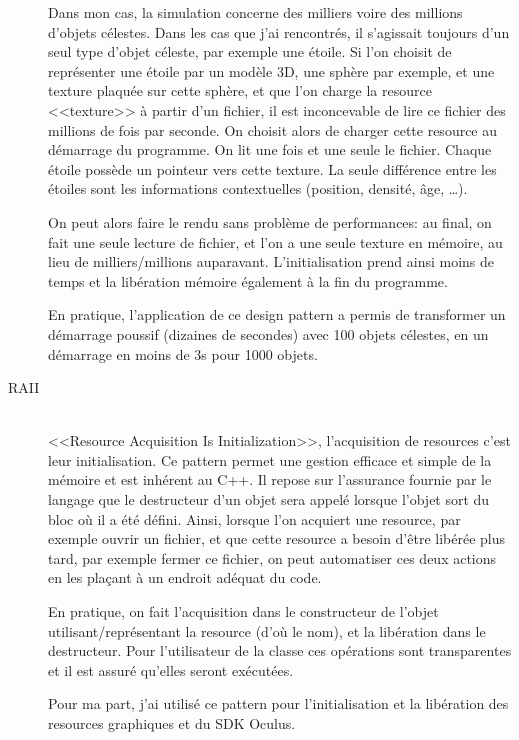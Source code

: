 \documentclass[a4paper,french,12pt]{article}
\begin{document}
\begin{description}
	       Dans mon cas, la simulation concerne des milliers voire des millions d'objets célestes. Dans les cas que j'ai
	       rencontrés, il s'agissait toujours d'un seul type d'objet céleste, par exemple une étoile.
	       Si l'on choisit de représenter une étoile par un modèle 3D, une sphère par exemple, et une
	       texture plaquée sur cette sphère, et que l'on charge la resource <<texture>> à partir d'un fichier, il est inconcevable
	       de lire ce fichier des millions de fois par seconde.
	       On choisit alors de charger cette resource au démarrage du programme. On lit une fois et une seule le fichier.
	       Chaque étoile possède un pointeur vers cette texture. 
	       La seule différence entre les étoiles sont les informations contextuelles (position, densité, âge, \ldots).
	       
	       On peut alors faire le rendu sans problème de performances: au final, on fait une seule lecture de fichier, et
	       l'on a une seule texture en mémoire, au lieu de milliers/millions auparavant.
	       L'initialisation prend ainsi moins de temps et la libération mémoire également à la fin du programme.
	       
	       En pratique, l'application de ce design pattern a permis de transformer un démarrage poussif (dizaines de secondes) avec 100 objets célestes,
	       en un démarrage en moins de 3s pour 1000 objets.
	    
	    \item [RAII]~\\
	      <<Resource Acquisition Is Initialization>>, l'acquisition de resources c'est leur initialisation.
	      Ce pattern permet une gestion efficace et simple de la mémoire et est inhérent au C++.
	      Il repose sur l'assurance fournie par le langage que le destructeur d'un objet sera appelé lorsque l'objet
	      sort du bloc où il a été défini.
	      Ainsi, lorsque l'on acquiert une resource, par exemple ouvrir un fichier, et que cette resource a besoin
	      d'être libérée plus tard, par exemple fermer ce fichier, on peut automatiser ces deux actions en les plaçant
	      à un endroit adéquat du code.
	      
	      En pratique, on fait l'acquisition dans le constructeur de l'objet utilisant/représentant la resource (d'où le nom), et 
	      la libération dans le destructeur. Pour l'utilisateur de la classe ces opérations sont transparentes et il est
	      assuré qu'elles seront exécutées.
	      
	      
	      Pour ma part, j'ai utilisé ce pattern pour l'initialisation et la libération des resources graphiques et
	      du SDK Oculus.
	    
	    \end{description}
\end{document}
